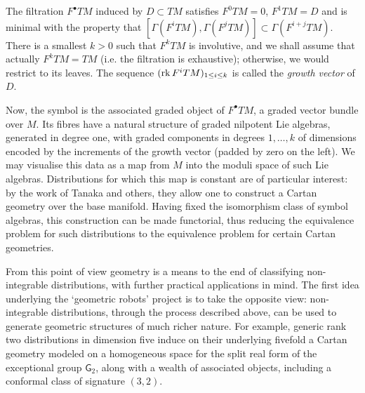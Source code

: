 The filtration $F^\bullet TM$ induced by $D \subset TM$
satisfies $F^0TM=0$, $F^1TM=D$ and is minimal with the property that $[\Gamma(F^iTM), \Gamma(F^jTM)]
\subset \Gamma(F^{i+j}TM)$. There is a smallest $k>0$ such that $F^kTM$ is involutive, and 
we shall assume that actually $F^k TM=TM$ (i.e. the filtration is exhaustive); otherwise,
we would restrict to its leaves. The sequence $(\operatorname{\mathrm{rk}} F^i TM)_{1 \le i \le k}$ is called the
\emph{growth vector} of $D$.

Now, the symbol is the associated graded object of $F^\bullet TM$, a graded vector bundle over $M$.
Its fibres have a natural structure of graded nilpotent
Lie algebras, generated in degree one, 
with graded components in degrees $1,\dots,k$ of dimensions encoded by the increments
of the growth vector (padded by zero on the left). 
We may visualise this data as a map from $M$ into the moduli space of such 
Lie algebras. Distributions for which this map is constant are of particular interest: by the
work of Tanaka and others, they allow one to construct a Cartan geometry
over the base manifold. 
Having fixed the isomorphism class of symbol algebras, this construction
can be made functorial, thus reducing the equivalence problem for such
distributions to the equivalence problem for certain
Cartan geometries.

From this point of view geometry is a means to the end of classifying non-integrable distributions,
with further practical applications in mind. The first idea underlying the `geometric robots' project
is to take the opposite view: non-integrable distributions, through the process described above, can be
used to generate geometric structures of much richer nature. For example,
generic rank two distributions in dimension five induce on their underlying fivefold a Cartan geometry
modeled on a homogeneous space for the split real form of the exceptional group $\mathsf{G}_2$, along
with a wealth of associated objects, including a conformal class of signature $(3,2)$.

